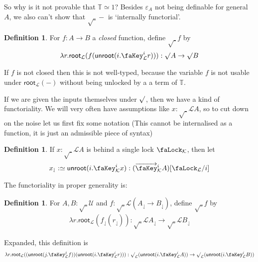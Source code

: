 \documentclass[10pt]{article}
\theoremstyle{definition}
\newtheorem{definition}[theorem]{Definition}
\let\oldequiv\equiv%
\renewcommand{\equiv}{\simeq}
\newcommand{\defeq}{\oldequiv}
\newcommand*{\univ}{\mathcal{U}}
\newcommand{\lock}{\text{\faLock}}
\newcommand{\key}{\text{\faKey}}
\newcommand{\Tiny}{\mathbb{T}}
\newcommand{\lockn}[1]{\mathcal{#1}}
\newcommand{\varkey}[2]{\key_{\lockn{#1}}^{#2}}
\newcommand{\admkey}[2]{\overrightarrow{\key}_{\lockn{#1}}^{#2}}
\newcommand{\ctxlock}[1]{\lock_{\lockn{#1}}}
\newcommand{\locksub}[2]{\lock_{#1}/#2}
\newcommand{\rform}[2]{\surd_{\lockn{#1}} #2}
\newcommand{\rintro}[2]{\mathsf{root}_{\lockn{#1}}(#2)}
\newcommand{\relim}[1]{\mathsf{unroot}(#1)}
\newcommand{\rget}[1]{#1_{\downharpoonleft}}
\begin{document}
So why is it not provable that $\Tiny \equiv 1$? Besides $\varepsilon_A$ not being definable for general $A$, we also can't show that $\rform{} -$ is `internally functorial'. 

\begin{definition}
For $f : A \to B$ a \emph{closed} function, define $\rform{} f$ by 
\begin{align*}
\lambda r. \rintro{L}{f(\relim{i.\varkey{L}{i} r})} : \rform{} A \to \rform{} B
\end{align*}
\end{definition}
If $f$ is not closed then this is not well-typed, because the variable $f$ is not usable under $\rintro{L}{-}$ without being unlocked by a a term of $\Tiny$. 

If we are given the inputs themselves under $\rform{}$, then we have a kind of functoriality. We will very often have assumptions like $x : \rform{L} A$, so to cut down on the noise let us first fix some notation (This cannot be internalised as a function, it is just an admissible piece of syntax)
\begin{definition}
If $x : \rform{L} A$ is behind a single lock $\ctxlock{K}$, then let
\begin{align*}
\rget{x} :\defeq \relim{i.\varkey{K}{i} x} : (\admkey{K}{i}A)[\locksub{\lockn{L}}{i}]
\end{align*}
\end{definition}
The functoriality in proper generality is:
\begin{definition}
For $A,B : \rform{} \univ$ and $f : \rform{L}(\rget{A} \to \rget{B})$, define $\rform{} f$ by
\begin{align*}
\lambda r. \rintro{L}{\rget{f}(\rget{r})} : \rform{L}\rget{A} \to \rform{L}\rget{B}
\end{align*}
\end{definition}
Expanded, this definition is
\begin{align*}
\lambda r. \rintro{L}{(\relim{j.\varkey{L}{j} f})(\relim{i.\varkey{L}{i} r})} : \rform{L}(\relim{i.\varkey{L}{i} A}) \to \rform{L}(\relim{i.\varkey{L}{i} B})
\end{align*}
\end{document}
